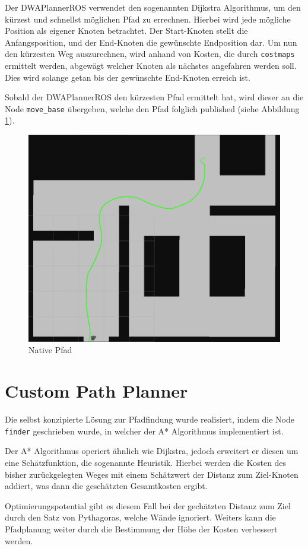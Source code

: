 \documentclass{article}
\begin{document}
Der DWAPlannerROS verwendet den sogenannten Dijkstra Algorithmus, um den kürzest und schnellst möglichen Pfad zu errechnen. Hierbei wird jede mögliche Position als eigener Knoten betrachtet. Der Start-Knoten stellt die Anfangsposition, und der End-Knoten die gewünschte Endposition dar. Um nun den kürzesten Weg auszurechnen, wird anhand von Kosten, die durch \verb|costmaps| ermittelt werden, abgewägt welcher Knoten als nächstes angefahren werden soll. Dies wird solange getan bis der gewünschte End-Knoten erreich ist. 

Sobald der DWAPlannerROS den kürzesten Pfad ermittelt hat, wird dieser an die Node \verb|move_base| übergeben, welche den Pfad folglich published (siehe Abbildung \ref{path_nativ}).

\begin{figure}[!htbp]
    \centering
    \includegraphics[width=0.5\linewidth]{PICs/nativ_rviz_plan.png}
    \caption{Native Pfad}\label{path_nativ}
\end{figure}

\section{Custom Path Planner}

Die selbst konzipierte Lösung zur Pfadfindung wurde realisiert, indem die Node \verb|finder| geschrieben wurde, in welcher der A* Algorithmus implementiert ist.

Der A* Algorithmus operiert ähnlich wie Dijkstra, jedoch erweitert er diesen um eine Schätzfunktion, die sogenannte Heuristik. Hierbei werden die Kosten des bisher zurückgelegten Weges mit einem Schätzwert der Distanz zum Ziel-Knoten addiert, was dann die geschätzten Gesamtkosten ergibt. 

Optimierungspotential gibt es diesem Fall bei der gechätzten Distanz zum Ziel durch den Satz von Pythagoras, welche Wände ignoriert. Weiters kann die Pfadplanung weiter durch die Bestimmung der Höhe der Kosten verbessert werden.
\end{document}
